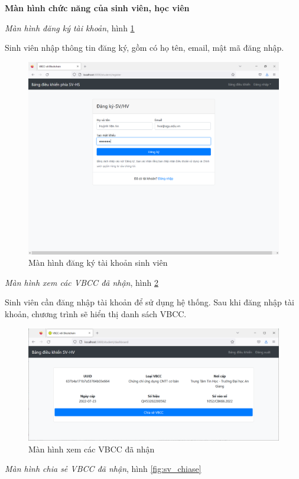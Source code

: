 \textbf{Màn hình chức năng của sinh viên, học viên}

\emph{Màn hình đăng ký tài khoản}, hình \ref{fig:std_new}

Sinh viên nhập thông tin đăng ký, gồm có họ tên, email, mật mã đăng nhập.

\begin{figure}[H]
\centering
\includegraphics[width=.9\linewidth]{img/std_new.PNG}
\caption{Màn hình đăng ký tài khoản sinh viên}
\label{fig:std_new}
\end{figure}


\emph{Màn hình xem các VBCC đã nhận}, hình \ref{fig:sv_hva}

Sinh viên cần đăng nhập tài khoản để sử dụng hệ thống.
Sau khi đăng nhập tài khoản, chương trình sẽ hiển thị danh sách VBCC.
\begin{figure}[H]
\centering
\includegraphics[width=.9\linewidth]{img/sv_hva.PNG}
\caption{Màn hình xem các VBCC đã nhận}
\label{fig:sv_hva}
\end{figure}

\emph{Màn hình chia sẻ VBCC đã nhận}, hình \ref{fig:sv_chiase}

